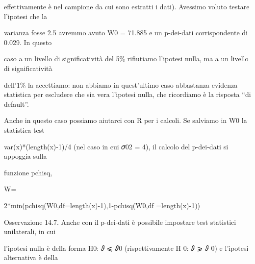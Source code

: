 \documentclass[a4paper,portrait,12pt]{article}
\begin{document}
\begin{flushleft}
effettivamente \`{e} nel campione da cui sono estratti i dati). Avessimo voluto testare l'ipotesi che la
\end{flushleft}


\begin{flushleft}
varianza fosse 2.5 avremmo avuto W0 = 71.885 e un p-dei-dati corrispondente di 0.029. In questo
\end{flushleft}


\begin{flushleft}
caso a un livello di significativit\`{a} del 5\% rifiutiamo l'ipotesi nulla, ma a un livello di significativit\`{a}
\end{flushleft}


\begin{flushleft}
dell'1\% la accettiamo: non abbiamo in quest'ultimo caso abbastanza evidenza statistica per escludere che sia vera l'ipotesi nulla, che ricordiamo \`{e} la risposta {``}di default''.
\end{flushleft}


\begin{flushleft}
Anche in questo caso possiamo aiutarci con R per i calcoli. Se salviamo in W0 la statistica test
\end{flushleft}


\begin{flushleft}
var(x)*(length(x)-1)/4 (nel caso in cui 𝜎02 = 4), il calcolo del p-dei-dati si appoggia sulla
\end{flushleft}


\begin{flushleft}
funzione pchisq,
\end{flushleft}


\begin{flushleft}
W=
\end{flushleft}





\begin{flushleft}
2*min(pchisq(W0,df=length(x)-1),1-pchisq(W0,df =length(x)-1))
\end{flushleft}


\begin{flushleft}
Osservazione 14.7. Anche con il p-dei-dati \`{e} possibile impostare test statistici unilaterali, in cui
\end{flushleft}


\begin{flushleft}
l'ipotesi nulla \`{e} della forma H0: 𝜗 ⩽ 𝜗0 (rispettivamente H 0: 𝜗 ⩾ 𝜗 0) e l'ipotesi alternativa \`{e} della
\end{flushleft}
\end{document}
